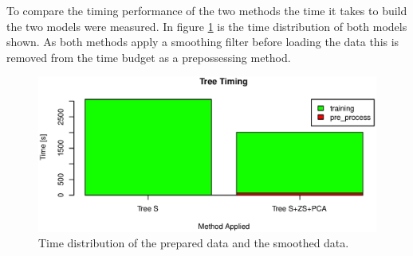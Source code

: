 To compare the timing performance of the two methods the time it takes to build the two models were measured.
In figure \ref{fig:tree_time_distribution} is the time distribution of both models shown.
As both methods apply a smoothing filter before loading the data this is removed from the time budget as a prepossessing method.

\begin{figure}[H]
\centering
\includegraphics[width=\textwidth]{graphics/algo_compare_timing_tree}
\caption{Time distribution of the prepared data and the smoothed data.}
\label{fig:tree_time_distribution}
\end{figure}